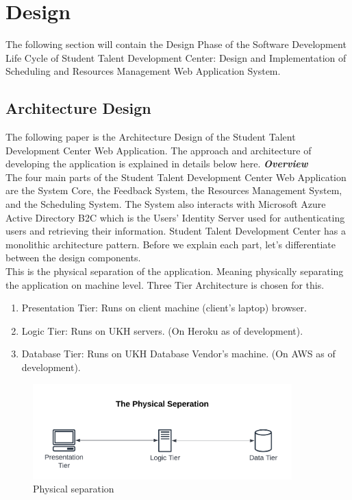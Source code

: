 \section{Design}
\begin{justify}
    The following section will contain the Design Phase of the Software Development Life Cycle of Student Talent Development Center: Design and Implementation of Scheduling and Resources Management Web Application System.
\end{justify}
\vspace{0.5cm}
\subsection{Architecture Design}
\begin{justify}
The following paper is the Architecture Design of the Student Talent Development Center Web Application. The approach and architecture of developing the application is explained in details below here.
\vspace{0.25cm}
\newendline \textbf{\textit{Overview}}\\
The four main parts of the Student Talent Development Center Web Application are the System Core, the Feedback System, the Resources Management System, and the Scheduling System. The System also interacts with Microsoft Azure Active Directory B2C which is the Users’ Identity Server used for authenticating users and retrieving their information. Student Talent Development Center has a monolithic architecture pattern. Before we explain each part, let’s differentiate between the design components.
\vspace{0.25cm}
\\
This is the physical separation of the application. Meaning physically separating the application on machine level. Three Tier Architecture is chosen for this.
\begin{enumerate}[itemsep=-0.3cm]
    \item Presentation Tier: Runs on client machine (client’s laptop) browser.
    \item Logic Tier: Runs on UKH servers. (On Heroku as of development).
    \item Database Tier: Runs on UKH Database Vendor’s machine. (On AWS as of development).
\end{enumerate}

\begin{figure}[H]
    \centerline{\includegraphics[width=100mm,scale=1]{figures/analysis_and_design/design/Physical Seperation V1.png}}
    \caption{Physical separation}
    \label{physicalSeparation}
\end{figure}


\end{justify}
